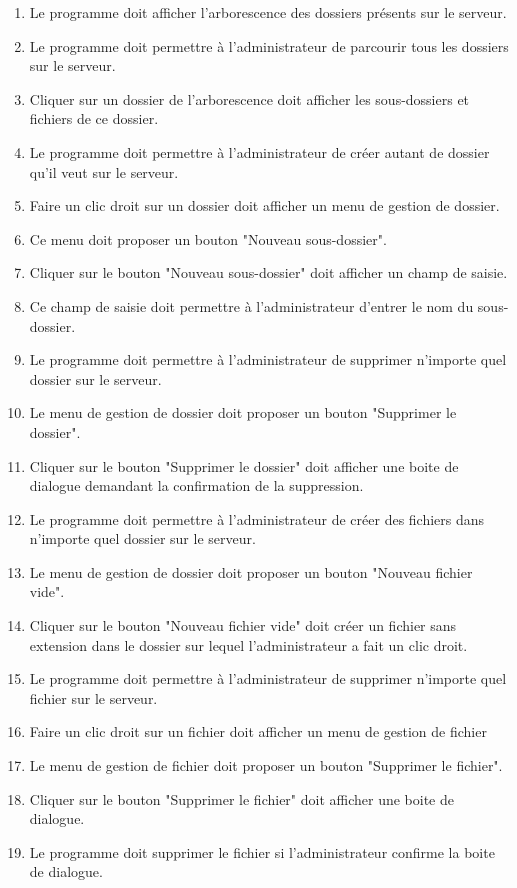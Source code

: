 \documentclass[10pt,a4paper]{report}
\begin{document}
	\begin{enumerate}
		\item Le programme doit afficher l'arborescence des dossiers présents sur le serveur.
		\item Le programme doit permettre à l'administrateur de parcourir tous les dossiers sur le serveur.
		\item Cliquer sur un dossier de l'arborescence doit afficher les sous-dossiers et fichiers de ce dossier.
		\item Le programme doit permettre à l'administrateur de créer autant de dossier qu'il veut sur le serveur.
		\item Faire un clic droit sur un dossier doit afficher un menu de gestion de dossier.
		\item Ce menu doit proposer un bouton "Nouveau sous-dossier".
		\item Cliquer sur le bouton "Nouveau sous-dossier" doit afficher un champ de saisie.
		\item Ce champ de saisie doit permettre à l'administrateur d'entrer le nom du sous-dossier.
		\item Le programme doit permettre à l'administrateur de supprimer n'importe quel dossier sur le serveur.
		\item Le menu de gestion de dossier doit proposer un bouton "Supprimer le dossier".
		\item Cliquer sur le bouton "Supprimer le dossier" doit afficher une boite de dialogue demandant la confirmation de la suppression.
		\item Le programme doit permettre à l'administrateur de créer des fichiers dans n'importe quel dossier sur le serveur.
		\item Le menu de gestion de dossier doit proposer un bouton "Nouveau fichier vide".
		\item Cliquer sur le bouton "Nouveau fichier vide" doit créer un fichier sans extension dans le dossier sur lequel l'administrateur a fait un clic droit.
		\item Le programme doit permettre à l'administrateur de supprimer n'importe quel fichier sur le serveur.
		\item Faire un clic droit sur un fichier doit afficher un menu de gestion de fichier
		\item Le menu de gestion de fichier doit proposer un bouton "Supprimer le fichier".
		\item Cliquer sur le bouton "Supprimer le fichier" doit afficher une boite de dialogue.
		\item Le programme doit supprimer le fichier si l'administrateur confirme la boite de dialogue.
	\end{enumerate}	
	
\end{document}
